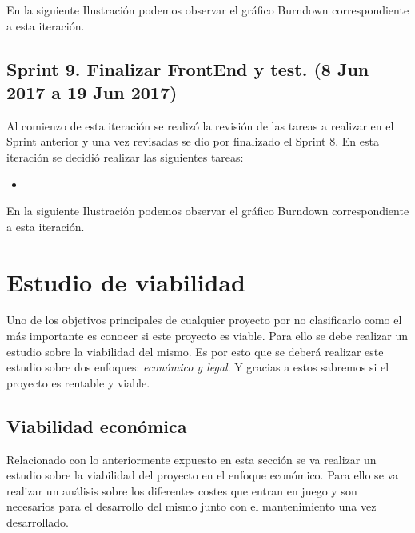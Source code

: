 En la siguiente Ilustración podemos observar el gráfico Burndown correspondiente a esta iteración.


\subsection{Sprint 9. Finalizar FrontEnd y test. (8 Jun 2017 a 19 Jun 2017)}

Al comienzo de esta iteración se realizó la revisión de las tareas a realizar en el Sprint anterior y una vez revisadas se dio por finalizado el Sprint 8. 
En esta iteración se decidió realizar las siguientes tareas:

\begin{itemize}

	\item 


\end{itemize}

En la siguiente Ilustración podemos observar el gráfico Burndown correspondiente a esta iteración.




\section{Estudio de viabilidad}

Uno de los objetivos principales de cualquier proyecto por no clasificarlo como el más importante es conocer si este proyecto es viable. Para ello se debe realizar un estudio sobre la viabilidad del mismo. Es por esto que se deberá realizar este estudio sobre dos enfoques: \emph{económico y legal}. Y gracias a estos sabremos si el proyecto es rentable y viable.

\subsection{Viabilidad económica}

Relacionado con lo anteriormente expuesto en esta sección se va realizar un estudio sobre la viabilidad del proyecto en el enfoque económico. Para ello se va realizar un análisis sobre los diferentes costes que entran en juego y son necesarios para el desarrollo del mismo junto con el mantenimiento una vez desarrollado.

